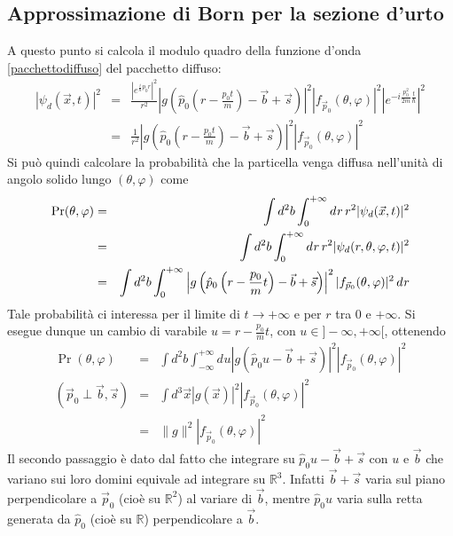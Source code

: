 \documentclass[../../FisicaTeorica.tex]{subfiles}
\begin{document}
\subsection{Approssimazione di Born per la sezione d'urto}

A questo punto si calcola il modulo quadro della funzione
d'onda \eqref{pacchettodiffuso} del pacchetto diffuso:
\begin{eqnarray*}
  | \psi_d (\vec{x}, t) |^2 & = & \frac{\left| e^{\frac{i}{\hbar} p_0 r}
  \right|^2}{r^2}  \left| g \left( \hat{p}_0  \left( r - \frac{p_0 t}{m}
  \right) - \vec{b} + \vec{s} \right) \right|^2 | f_{\vec{p}_0} (\theta,
  \varphi) |^2 \left| e^{- i \frac{p_0^2}{2 m}  \frac{t}{\hbar}} \right|^2\\
  & = & \frac{1}{r^2}  \left| g \left( \hat{p}_0  \left( r - \frac{p_0 t}{m}
  \right) - \vec{b} + \vec{s} \right) \right|^2 | f_{\vec{p}_0} (\theta,
  \varphi) |^2
\end{eqnarray*}
Si pu{\`o} quindi calcolare la probabilit{\`a} che la particella venga diffusa
nell'unit{\`a} di angolo solido lungo $(\theta, \varphi)$ come
\begin{eqnarray*}
  \Pr (\theta, \varphi) & = & \int d^2 b \int_0^{+ \infty} d^{} r
  \hspace{0.17em} r^2  | \psi_d (\vec{x}, t) |^2\\
  & = & \int d^2 b \int_0^{+ \infty} d^{} r \hspace{0.17em} r^2  | \psi_d (r,
  \theta, \varphi, t) |^2\\
  & = & \int d^2 b \int_0^{+ \infty} \left| g \left( \hat{p}_0  \left( r -
  \frac{p_0}{m} t \right) - \vec{b} + \vec{s} \right) \right|^2  |
  f_{\vec{p}_0} (\theta, \varphi) |^2 \hspace{0.17em} d^{} r
\end{eqnarray*}
Tale probabilit{\`a} ci interessa per il limite di $t \to + \infty$ e per $r$
tra $0$ e $+ \infty$. Si esegue dunque un cambio di varabile $u = r -
\frac{p_0}{m} t$, con $u \in] - \infty, + \infty [$, ottenendo
\begin{eqnarray*}
  \Pr (\theta, \varphi) & = & \int d^2 b \int_{- \infty}^{+ \infty} d^{} u | g
  (\hat{p}_0 u - \vec{b} + \vec{s}) |^2 | f_{\vec{p}_0} (\theta, \varphi)
  |^2\\
  (\vec{p}_0 \perp \vec{b}, \vec{s}) & = & \int d^3 \vec{x}  | g (\vec{x}) |^2
  | f_{\vec{p}_0} (\theta, \varphi) |^2\\
  & = & \| g \|^2  | f_{\vec{p}_0} (\theta, \varphi) |^2
\end{eqnarray*}
Il secondo passaggio {\`e} dato dal fatto che integrare su  $\hat{p}_0 u - \vec{b}
+ \vec{s}$ con $u$ e $\vec{b}$ che variano sui loro domini equivale ad
integrare su $\mathbb{R}^3$. Infatti $\vec{b} + \vec{s}$ varia sul piano
perpendicolare a $\vec{p}_0$ (cio{\`e} su $\mathbb{R}^2$) al variare di
$\vec{b}$, mentre $\hat{p}_0 u$ varia sulla retta generata da $\hat{p}_0$
(cio{\`e} su $\mathbb{R}$) perpendicolare a $\vec{b}$.
\end{document}
